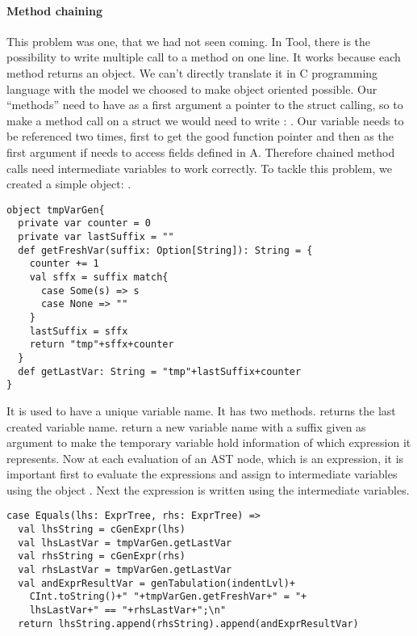 \paragraph{Method chaining}
This problem was one, that we had not seen coming.
\newline
In Tool, there is the possibility to write multiple call to a method on one line.
It works because each method returns an object.
We can't directly translate it in C programming language with the model we choosed to make object oriented possible.
Our ``methods'' need to have as a first argument a pointer to the struct calling,
so to make a method call on a struct we would need to write : \lstset{style=customc}{\lstinline[basicstyle=\small\ttfamily]|void * a = new(nA); ((struct A *) a)->foo(a)|}.
Our variable \lstset{style=customc}{\lstinline[basicstyle=\small\ttfamily]|a|} needs to be referenced two times,
first to get the good function pointer and then as the first argument if \lstset{style=customc}{\lstinline[basicstyle=\small\ttfamily]|foo|}
needs to access fields defined in A.
Therefore chained method calls need intermediate variables to work correctly.
To tackle this problem, we created a simple object: .
\lstset{style=customscala}
\begin{lstlisting}
object tmpVarGen{
  private var counter = 0
  private var lastSuffix = ""
  def getFreshVar(suffix: Option[String]): String = {
    counter += 1
    val sffx = suffix match{
      case Some(s) => s
      case None => ""
    }
    lastSuffix = sffx
    return "tmp"+sffx+counter
  }
  def getLastVar: String = "tmp"+lastSuffix+counter
}
\end{lstlisting}
It is used to have a unique variable name. It has two methods.
 returns the last created variable name.
 return a new variable name with a suffix given as argument to make the temporary variable hold information of which expression it represents.
\newline
Now at each evaluation of an AST node, which is an expression, it is important first to evaluate the expressions
and assign to intermediate variables using the object . Next the expression is written using
the intermediate variables.
\begin{lstlisting}
case Equals(lhs: ExprTree, rhs: ExprTree) =>
  val lhsString = cGenExpr(lhs)
  val lhsLastVar = tmpVarGen.getLastVar
  val rhsString = cGenExpr(rhs)
  val rhsLastVar = tmpVarGen.getLastVar
  val andExprResultVar = genTabulation(indentLvl)+
    CInt.toString()+" "+tmpVarGen.getFreshVar+" = "+
    lhsLastVar+" == "+rhsLastVar+";\n"
  return lhsString.append(rhsString).append(andExprResultVar)
\end{lstlisting}
